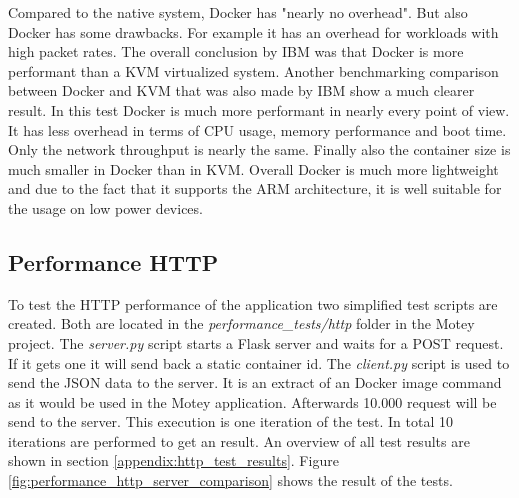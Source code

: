 Compared to the native system, Docker has "nearly no overhead"\autocite[p. 6]{IBM:Performance:2014}.
But also Docker has some drawbacks.
For example it has an overhead for workloads with high packet rates.\autocite[cf.][p. 6]{IBM:Performance:2014}
The overall conclusion by IBM was that Docker is more performant than a \ac{KVM} virtualized system.
\newpage
Another benchmarking comparison\autocite{Russell:Performance:2014} between Docker and \ac{KVM} that was also made by IBM show a much clearer result.
In this test Docker is much more performant in nearly every point of view.
It has less overhead in terms of \ac{CPU} usage\autocite[cf.][p. 25]{Russell:Performance:2014}, memory performance\autocite[cf.][p. 50]{Russell:Performance:2014} and boot time\autocite[cf.][p. 24]{Russell:Performance:2014}.
Only the network throughput is nearly the same.\autocite[cf.][p. 52]{Russell:Performance:2014}
Finally also the container size is much smaller in Docker than in \ac{KVM}.\autocite[cf.][p. 66]{Russell:Performance:2014}
Overall Docker is much more lightweight and due to the fact that it supports the ARM architecture, it is well suitable for the usage on low power devices.

\subsection{Performance HTTP}
To test the \ac{HTTP} performance of the application two simplified test scripts are created.
Both are located in the \textit{performance\_tests/http} folder in the Motey project.
The \textit{server.py} script starts a Flask server and waits for a POST request.
If it gets one it will send back a static container id.
The \textit{client.py} script is used to send the \ac{JSON} data to the server.
It is an extract of an Docker image command as it would be used in the Motey application.
Afterwards 10.000 request will be send to the server.
This execution is one iteration of the test.
In total 10 iterations are performed to get an result.
An overview of all test results are shown in section \ref{appendix:http_test_results}.
Figure \ref{fig:performance_http_server_comparison} shows the result of the tests.

